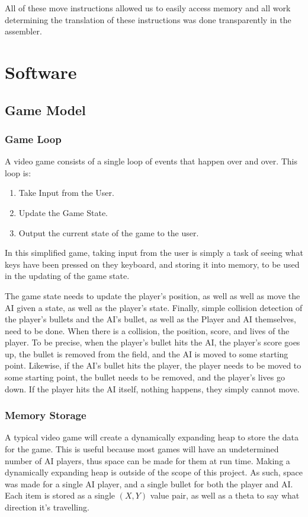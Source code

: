 \documentclass[onecolumn]{IEEEtran}
\begin{document}
All of these move instructions allowed us to easily access memory and all work determining the translation of these instructions was done transparently in the assembler.

\section{Software}
\subsection{Game Model}
\subsubsection{Game Loop}
A video game consists of a single loop of events that happen over and over.  This loop is:

\begin{enumerate}
	\item Take Input from the User.
	\item Update the Game State.
	\item Output the current state of the game to the user.
\end{enumerate}

In this simplified game, taking input from the user is simply a task of seeing what keys have been pressed on they keyboard, and storing it into memory, to be used in the updating of the game state.

The game state needs to update the player's position, as well as well as move the AI given a state, as well as the player's state.  Finally, simple collision detection of the player's bullets and the AI's bullet, as well as the Player and AI themselves, need to be done.  When there is a collision, the position, score, and lives of the player.  To be precise, when the player's bullet hits the AI, the player's score goes up, the bullet is removed from the field, and the AI is moved to some starting point.  Likewise, if the AI's bullet hits the player, the player needs to be moved to some starting point, the bullet needs to be removed, and the player's lives go down.  If the player hits the AI itself, nothing happens, they simply cannot move.

\subsubsection{Memory Storage}
A typical video game will create a dynamically expanding heap to store the data for the game.  This is useful because most games will have an undetermined number of AI players, thus space can be made for them at run time.  Making a dynamically expanding heap is outside of the scope of this project.  As such, space was made for a single AI player, and a single bullet for both the player and AI.  Each item is stored as a single $(X,Y)$ value pair, as well as a theta to say what direction it's travelling.
\end{document}
